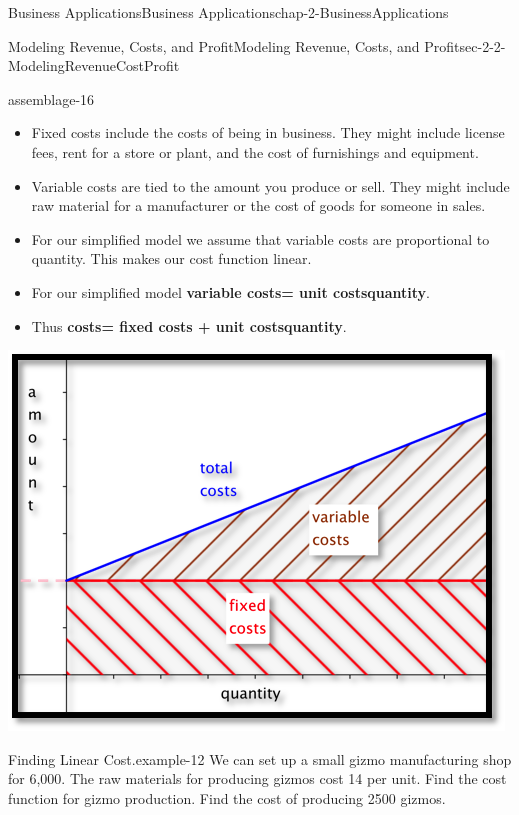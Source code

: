 \documentclass[oneside,10pt,]{book}
\newcommand{\terminology}[1]{\textbf{#1}}
\numberwithin{equation}{section}
\begin{document}
\begin{chapterptx}{Business Applications}{}{Business Applications}{}{}{chap-2-BusinessApplications}
\begin{sectionptx}{Modeling Revenue, Costs, and Profit}{}{Modeling Revenue, Costs, and Profit}{}{}{sec-2-2-ModelingRevenueCostProfit}
\begin{assemblage}{}{assemblage-16}
\begin{itemize}[label=\textbullet]
\item{}\hypertarget{p-648}{}%
Fixed costs include the costs of being in business.  They might include license fees, rent for a store or plant, and the cost of furnishings and equipment.%
\item{}\hypertarget{p-649}{}%
Variable costs are tied to the amount you produce or sell.  They might include raw material for a manufacturer or the cost of goods for someone in sales.%
\item{}\hypertarget{p-650}{}%
For our simplified model we assume that variable costs are proportional to quantity.  This makes our cost function linear.%
\item{}\hypertarget{p-651}{}%
For our simplified model \terminology{variable costs= unit costs\textasteriskcentered{}quantity}.%
\item{}\hypertarget{p-652}{}%
Thus \terminology{costs= fixed costs + unit costs\textasteriskcentered{}quantity}.%
\end{itemize}
%
\end{assemblage}
\begin{sidebyside}{1}{0.2}{0.2}{0}%
\begin{sbspanel}{0.6}%
\includegraphics[width=1\linewidth]{images/sec2-2-5.png}
\end{sbspanel}%
\end{sidebyside}%
\begin{example}{Finding Linear Cost.}{example-12}%
\hypertarget{p-653}{}%
We can set up a small gizmo manufacturing shop for \textdollar{}6,000. The raw materials for producing gizmos cost \textdollar{}14 per unit.  Find the cost function for gizmo production.  Find the cost of producing 2500 gizmos.%

\end{example}
\end{sectionptx}
\end{chapterptx}
\end{document}
